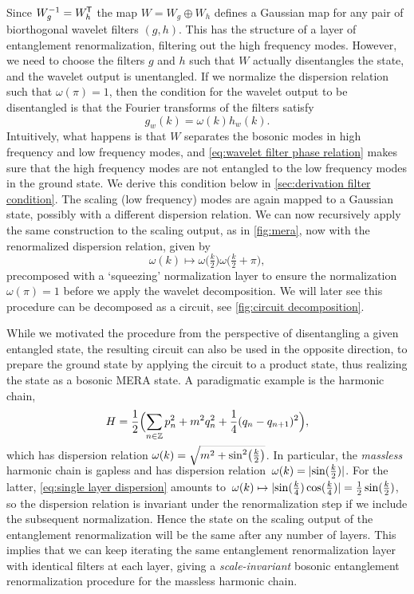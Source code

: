 \documentclass[submission, Phys]{SciPost}
\theoremstyle{definition}
\theoremstyle{remark}
\DeclarePairedDelimiter{\abs}{\lvert}{\rvert}
\newcommand{\ZZ}{\mathbb Z}
\newcommand{\op}{\oplus}
\newcommand*{\tran}{{\mkern-1.5mu\mathsf{T}}}
\begin{document}
Since $W_g^{-1} = W_h^{\tran}$ the map $W = W_g \op W_h$ defines a Gaussian map for any pair of biorthogonal wavelet filters $(g,h)$.
This has the structure of a layer of entanglement renormalization, filtering out the high frequency modes.
However, we need to choose the filters $g$ and $h$ such that $W$ actually disentangles the state, and the wavelet output is unentangled.
If we normalize the dispersion relation such that $\omega(\pi) = 1$, then the condition for the wavelet output to be disentangled is that the Fourier transforms of the filters satisfy
\begin{equation}\label{eq:wavelet filter phase relation}
  g_w(k) = \omega(k)h_w(k).
\end{equation}
Intuitively, what happens is that $W$ separates the bosonic modes in high frequency and low frequency modes, and \cref{eq:wavelet filter phase relation} makes sure that the high frequency modes are not entangled to the low frequency modes in the ground state.
We derive this condition below in \cref{sec:derivation filter condition}.
The scaling (low frequency) modes are again mapped to a Gaussian state, possibly with a different dispersion relation.
We can now recursively apply the same construction to the scaling output, as in \cref{fig:mera}, now with the renormalized dispersion relation, given by
\begin{equation}\label{eq:single layer dispersion}
  \omega(k) \mapsto \omega\bigl(\tfrac{k}{2}\bigr) \omega\bigl(\tfrac{k}{2} + \pi\bigr),
\end{equation}
precomposed with a `squeezing' normalization layer to ensure the normalization $\omega(\pi) = 1$ before we apply the wavelet decomposition.
We will later see this procedure can be decomposed as a circuit, see \cref{fig:circuit decomposition}.

While we motivated the procedure from the perspective of disentangling a given entangled state, the resulting circuit can also be used in the opposite direction, to prepare the ground state by applying the circuit to a product state, thus realizing the state as a bosonic MERA state.
A paradigmatic example is the harmonic chain,
\begin{equation}\label{eq:harmonic chain ham}
  H = \frac12 \Bigl( \sum_{n \in \ZZ} p_n^2 + m^2q_n^2 + \frac14(q_n - q_{n+1})^2 \Bigr),
\end{equation}
which has dispersion relation $\omega(k) = \smash{\sqrt{m^2 + \sin^2\bigl(\frac{k}{2}\bigr)}}$.
In particular, the \emph{massless} harmonic chain is gapless and has dispersion relation~$\omega(k) = \abs{\sin(\frac{k}{2})}$.
For the latter, \cref{eq:single layer dispersion} amounts to~$\omega(k) \mapsto \abs{\sin(\frac{k}{4})\cos(\frac{k}{4})} = \frac12\sin(\frac{k}{2})$, so the dispersion relation is invariant under the renormalization step if we include the subsequent normalization.
Hence the state on the scaling output of the entanglement renormalization will be the same after any number of layers.
This implies that we can keep iterating the same entanglement renormalization layer with identical filters at each layer, giving a \emph{scale-invariant} bosonic entanglement renormalization procedure for the massless harmonic chain.
\end{document}
